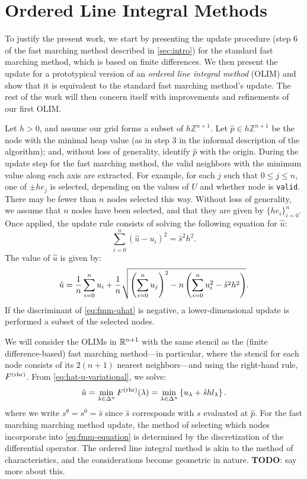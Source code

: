 \documentclass[eikonal.tex]{subfiles}
\begin{document}
\section{Ordered Line Integral Methods}

To justify the present work, we start by presenting the update
procedure (step 6 of the fast marching method described in
\cref{sec:intro}) for the standard fast marching method, which is
based on finite differences. We then present the update for a
prototypical version of an \emph{ordered line integral method} (OLIM)
and show that it is equivalent to the standard fast marching method's
update. The rest of the work will then concern itself with
improvements and refinements of our first OLIM.

Let $h > 0$, and assume our grid forms a subset of $h
\mathbb{Z}^{n+1}$. Let $\hat{p} \in h \mathbb{Z}^{n+1}$ be the node with the
minimal heap value (as in step 3 in the informal description of the
algorithm); and, without loss of generality, identify $\hat{p}$ with
the origin. During the update step for the fast marching method, the
valid neighbors with the minimum value along each axis are
extracted. For example, for each $j$ such that $0 \leq j \leq n$, one
of $\pm h e_j$ is selected, depending on the values of $U$ and whether
node is \texttt{valid}. There may be fewer than $n$ nodes selected
this way. Without loss of generality, we assume that $n$ nodes have
been selected, and that they are given by $\{h e_i\}_{i=0}^n$. Once
applied, the update rule consists of solving the following equation
for $\hat{u}$:
\begin{equation}
  \label{eq:fmm-equation}
  \sum_{i=0}^n {(\hat{u} - u_i)}^2 = \hat{s}^2 h^2.
\end{equation}
The value of $\hat{u}$ is given by:
\begin{equation}
  \label{eq:fmm-uhat}
  \hat{u} = \frac{1}{n} \sum_{i=0}^n u_i + \frac{1}{n} \sqrt{\left(\sum_{i=0}^n u_j\right)^2 - n \left(\sum_{i=0}^n u_i^2 - \hat{s}^2 h^2\right)}.
\end{equation}
If the discriminant of \cref{eq:fmm-uhat} is negative, a
lower-dimensional update is performed a subset of the selected nodes.

We will consider the OLIMs in $\mathbb{R}^{n+1}$ with the same stencil as the
(finite difference-based) fast marching method---in particular, where
the stencil for each node consists of its $2(n+1)$ nearest
neighbors---and using the right-hand rule, $F^{\operatorname{(rhr)}}$. From
\cref{eq:hat-u-variational}, we solve:
\begin{equation}
  \label{eq:basic-olim-min}
  \hat{u} = \min_{\lambda \in \Delta^n} F^{\operatorname{(rhr)}}(\lambda) = \min_{\lambda \in \Delta^n} \left\{u_\lambda + \hat{s} h l_\lambda\right\}.
\end{equation}
where we write $s^\theta = s^0 = \hat{s}$ since $\hat{s}$ corresponds
with $s$ evaluated at $\hat{p}$. For the fast marching marching method
update, the method of selecting which nodes incorporate into
\cref{eq:fmm-equation} is determined by the discretization of the
differential operator. The ordered line integral method is akin to the
method of characteristics, and the considerations become geometric in
nature. \textbf{TODO}: say more about this.
\end{document}
